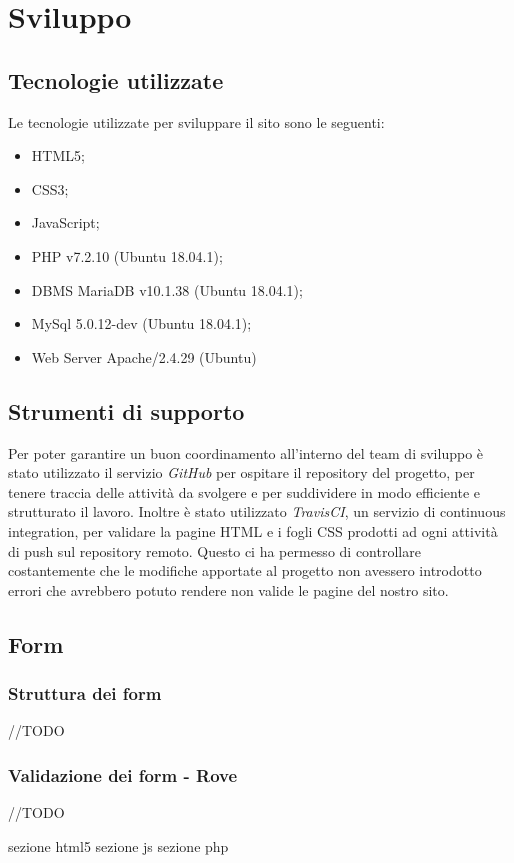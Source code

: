 \documentclass[12pt]{article}
\begin{document}
	\section{Sviluppo}
	\subsection{Tecnologie utilizzate}
	Le tecnologie utilizzate per sviluppare il sito sono le seguenti:
	\begin{itemize}
		\item HTML5;
		\item CSS3;
		\item JavaScript;
		\item PHP v7.2.10 (Ubuntu 18.04.1);
		\item DBMS MariaDB v10.1.38 (Ubuntu 18.04.1);
		\item MySql 5.0.12-dev (Ubuntu 18.04.1);
		\item Web Server Apache/2.4.29 (Ubuntu)
	\end{itemize}
	\subsection{Strumenti di supporto}
	Per poter garantire un buon coordinamento all'interno del team di sviluppo è stato utilizzato il servizio \emph{GitHub} per ospitare il repository del progetto, per tenere traccia delle attività da svolgere e per suddividere in modo efficiente e strutturato il lavoro. Inoltre è stato utilizzato \emph{TravisCI}, un servizio di continuous integration, per validare la pagine HTML e i fogli CSS prodotti ad ogni attività di push sul repository remoto. Questo ci ha permesso di controllare costantemente che le modifiche apportate al progetto non avessero introdotto errori che avrebbero potuto rendere non valide le pagine del nostro sito.
	\subsection{Form}
	\subsubsection{Struttura dei form}
	//TODO
	\subsubsection{Validazione dei form - Rove}
	//TODO	
	
	sezione html5
	sezione js
	sezione php
\end{document}
